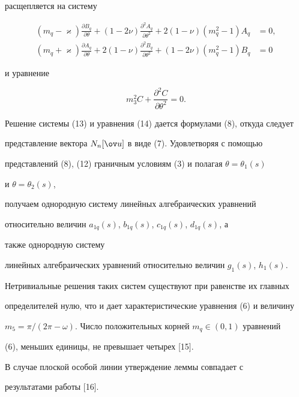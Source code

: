 \begin{pf}
расщепляется на систему 


\begin{equation} 


\begin{split} 


(m_q-\varkappa)\frac{\partial B_q}{\partial\theta}+(1-2\nu) 


\frac{\partial^2A_q}{\partial\theta^2}+2(1-\nu)(m^2_q-1)A_q&=0,\\ 


% 


(m_q+\varkappa)\frac{\partial A_q}{\partial\theta}+2(1-\nu) 


\frac{\partial^2B_q}{\partial\theta^2}+(1-2\nu)(m^2_q-1)B_q&=0 


\end{split} 


\end{equation} 


и уравнение 


\begin{equation} 


m^2_3C+\frac{\partial^2C}{\partial\theta^2}=0. 


\end{equation} 


Решение системы (13) и уравнения (14) дается формулами (8), откуда следует  


представление вектора $N_n[\ov u]$ в виде (7). Удовлетворяя с помощью  


представлений (8), (12) граничным условиям (3) и полагая $\theta=\theta_1(s)$ 


и $\theta=\theta_2(s)$, 


получаем однородную систему линейных алгебраических уравнений  


относительно величин $a_{1q}(s)$, $b_{1q}(s)$, $c_{1q}(s)$, $d_{1q}(s)$, а 


также однородную систему  


линейных алгебраических уравнений относительно величин $g_1(s)$, $h_1(s)$.  


Нетривиальные решения таких систем существуют при равенстве их главных  


определителей нулю, что и дает характеристические уравнения (6) и величину  


$m_5=\pi/(2\pi-\omega)$. Число положительных корней $m_q\in(0,1)$ уравнений 


(6), меньших единицы, не превышает четырех [15]. 


 


В случае плоской особой линии утверждение леммы совпадает с  


результатами работы [16]. 


\end{pf} 


